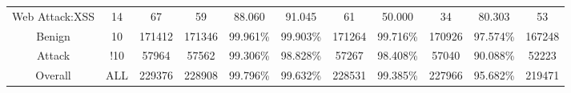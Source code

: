 \begin{table}[htb]
\begin{tabular}{@{}ccccccccccc@{}}
        Web Attack:XSS &  14 &  67 &  59 &  88.060 &  91.045 &  61 &  50.000 &  34 &  80.303 &  53 \\
        Benign &  10 &  171412 &  171346 &  99.961\% &  99.903\% &  171264 &  99.716\% &  170926 &  97.574\% &  167248 \\
        Attack &  !10 &  57964 &  57562 &  99.306\% &  98.828\% &  57267 &  98.408\% &  57040 &  90.088\% &  52223 \\
        Overall &  ALL &  229376 &  228908 &  99.796\% &  99.632\% &  228531 &  99.385\% &  227966 &  95.682\% &  219471 \\
        \bottomrule
    \end{tabular}
\end{table}